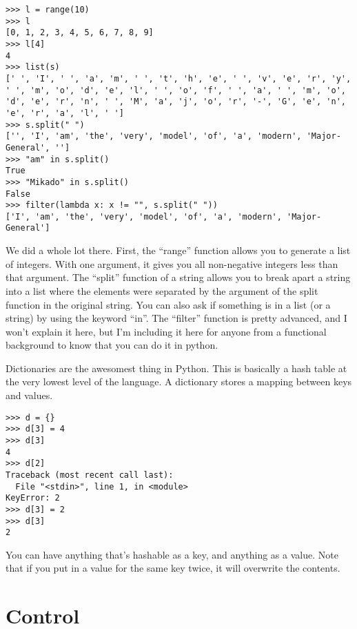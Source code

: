 \documentclass[12pt]{article}
\newenvironment{mylisting}
{\begin{list}{}{\setlength{\leftmargin}{1em}}\item\scriptsize\bfseries}
{\end{list}}
\begin{document}
\begin{enumerate}
\begin{mylisting}
\begin{verbatim}
>>> l = range(10)
>>> l
[0, 1, 2, 3, 4, 5, 6, 7, 8, 9]
>>> l[4]
4
>>> list(s)   
[' ', 'I', ' ', 'a', 'm', ' ', 't', 'h', 'e', ' ', 'v', 'e', 'r', 'y', ' ', 'm', 'o', 'd', 'e', 'l', ' ', 'o', 'f', ' ', 'a', ' ', 'm', 'o', 'd', 'e', 'r', 'n', ' ', 'M', 'a', 'j', 'o', 'r', '-', 'G', 'e', 'n', 'e', 'r', 'a', 'l', ' ']
>>> s.split(" ")
['', 'I', 'am', 'the', 'very', 'model', 'of', 'a', 'modern', 'Major-General', '']
>>> "am" in s.split()
True
>>> "Mikado" in s.split()
False
>>> filter(lambda x: x != "", s.split(" "))
['I', 'am', 'the', 'very', 'model', 'of', 'a', 'modern', 'Major-General']
\end{verbatim}
\end{mylisting}

We did a whole lot there.  First, the ``range'' function allows you to generate a list of integers.  With one argument, it gives you all non-negative integers less than that argument.  The ``split'' function of a string allows you to break apart a string into a list where the elements were separated by the argument of the split function in the original string.  You can also ask if something is in a list (or a string) by using the keyword ``in''.  The ``filter'' function is pretty advanced, and I won't explain it here, but I'm including it here for anyone from a functional background to know that you can do it in python.

\item[{\em dict}] Dictionaries are the awesomest thing in Python.  This is basically a hash table at the very lowest level of the language.  A dictionary stores a mapping between keys and values.

\begin{mylisting}
\begin{verbatim}
>>> d = {}
>>> d[3] = 4
>>> d[3]
4
>>> d[2]
Traceback (most recent call last):
  File "<stdin>", line 1, in <module>
KeyError: 2
>>> d[3] = 2
>>> d[3]
2
\end{verbatim}
\end{mylisting}

You can have anything that's hashable as a key, and anything as a value.  Note that if you put in a value for the same key twice, it will overwrite the contents.

\end{enumerate}

\section{Control}
\end{document}
